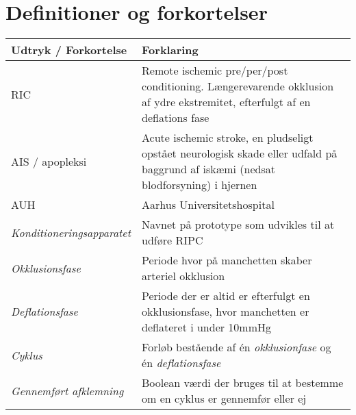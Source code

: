 \chapter{Definitioner og forkortelser}
	\begin{longtable}{ |p{} |p{}| } 
		\hline
		\textbf{Udtryk / Forkortelse} &  \textbf{Forklaring} \\
		\hline
		RIC & Remote ischemic pre/per/post conditioning. Længerevarende okklusion af ydre ekstremitet, efterfulgt af en deflations fase\\
		\hline
		AIS / apopleksi & Acute ischemic stroke, en pludseligt opstået neurologisk skade eller udfald på baggrund af iskæmi (nedsat blodforsyning) i hjernen \\
		\hline
		AUH & Aarhus Universitetshospital \\
		\hline
		\textit{Konditioneringsapparatet} & Navnet på prototype som udvikles til at udføre RIPC \\
		\hline
		\textit{Okklusionsfase} & Periode hvor på manchetten skaber arteriel okklusion \\
		\hline
		\textit{Deflationsfase} & Periode der er altid er efterfulgt en okklusionsfase, hvor manchetten er deflateret i under 10mmHg\\
		\hline
		\textit{Cyklus} & Forløb bestående af én \textit{okklusionfase} og én \textit{deflationsfase} \\
		\hline
		\textit{Gennemført afklemning} & Boolean værdi der bruges til at bestemme om en cyklus er gennemfør eller ej \\
		\hline
	\end{longtable}
\newpage